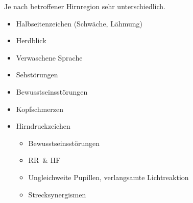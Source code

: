 {%
%   
%   
%   
%   
%   
%   
%   
%   
%   
%   
%   
}
{
Je nach betroffener Hirnregion sehr unterschiedlich.
\begin{itemize}
  \item Halbseitenzeichen (Schwäche, Lähmung)
  \item Herdblick
  \item Verwaschene Sprache
  \item Sehstörungen
  \item Bewusstseinsstörungen
  \item Kopfschmerzen
  \item Hirndruckzeichen
  \begin{itemize}
    \item Bewusstseinsstörungen
    \item RR\, \& HF\,
    \item Ungleichweite Pupillen, verlangsamte Lichtreaktion
    \item Strecksynergismen
  \end{itemize}
\end{itemize}
}{}{}{}



